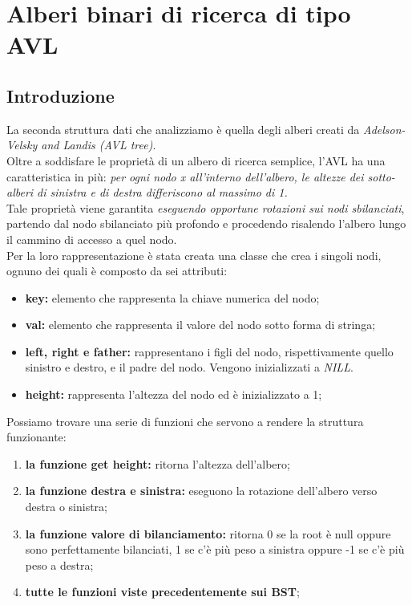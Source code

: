 \documentclass[a4paper]{article}
\begin{document}
		 \newpage
		 
		\section{Alberi binari di ricerca di tipo AVL}
			\subsection{Introduzione}
			La seconda struttura dati che analizziamo è quella degli alberi creati da \textit{Adelson-Velsky and Landis (AVL tree)}.\\
			Oltre a soddisfare le proprietà di un albero di ricerca semplice, l'AVL ha una caratteristica in più: \textit{per ogni nodo x all'interno dell'albero, le altezze dei sotto-alberi di sinistra e di destra differiscono al massimo di 1.}\\
			Tale proprietà viene garantita \textit{eseguendo opportune rotazioni sui nodi sbilanciati}, partendo dal nodo sbilanciato più profondo e procedendo risalendo l'albero lungo il cammino di accesso a quel nodo.\\
			Per la loro rappresentazione è stata creata una classe che crea i singoli nodi, ognuno dei quali è composto da sei attributi:
			\begin{itemize}
				\item \textbf{key:} elemento che rappresenta la chiave numerica del nodo;
				\item \textbf{val:} elemento che rappresenta il valore del nodo sotto forma di stringa;
				\item \textbf{left, right e father:} rappresentano i figli del nodo, rispettivamente quello sinistro e destro, e il padre del nodo. Vengono inizializzati a \textit{NILL}.
				\item \textbf{height:} rappresenta l'altezza del nodo ed è inizializzato a 1;
			\end{itemize}
			Possiamo trovare una serie di funzioni che servono a rendere la struttura funzionante:
			\begin{enumerate}
				\item \textbf{la funzione get height:} ritorna l'altezza dell'albero;
				\item \textbf{la funzione destra e sinistra:} eseguono la rotazione dell'albero verso destra o sinistra;
				\item \textbf{la funzione valore di bilanciamento:} ritorna 0 se la root è null oppure sono perfettamente bilanciati, 1 se c'è più peso a sinistra oppure -1 se c'è più peso a destra;
				\item \textbf{tutte le funzioni viste precedentemente sui BST};
			\end{enumerate}
\end{document}
